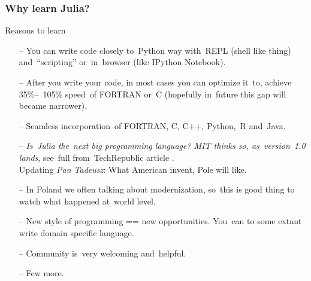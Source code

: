 \documentclass{beamer}  %
\begin{document}
\begin{frame}
  \frametitle{Why learn Julia?}

  \begin{block}{Reasons to learn}
    \begin{itemize}
    \item[--] You can write code closely to~Python way with~REPL
      (shell like thing) and~``scripting'' or~in~browser (like IPython
      Notebook).
    \item[--] After you write your code, in most cases you can
      optimize it~to, achieve 35\%--~105\% speed~of FORTRAN or~C
      (hopefully in~future this gap will became narrower).
    \item[--] Seamless incorporation~of FORTRAN, C, C++, Python,~R
      and~Java.
    \item[--] \emph{Is~Julia the~next big programming language? MIT
        thinks so, as~version~1.0 lands}, see~full from~TechRepublic
      article
      . \\
      Updating \emph{Pan Tadeusz}: What American invent, Pole will
      like.
    \item[--] In Poland we often talking about modernization, so~this
      is good thing to watch what happened at~world level.
    \item[--] New style of programming == new opportunities. You~can
      to some extant write domain specific language.
    \item[--] Community is~very welcoming and~helpful.
    \item[--] Few more.
    \end{itemize}
  \end{block}

\end{frame}
\end{document}

